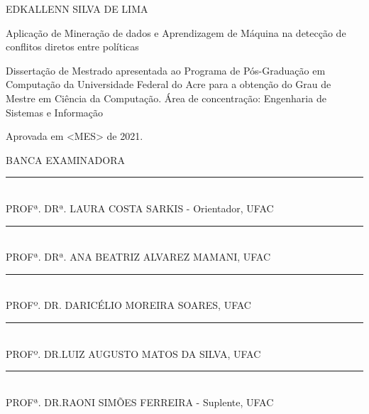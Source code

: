 \documentclass[
	12pt,				%
	openright,			%
	oneside,			%
	a4paper,			%
	english,			%
	french,				%
	spanish,			%
	brazil				%
	]{abntex2}
\begin{document}
\vspace{-60mm}

\begin{center}
	{\large EDKALLENN SILVA DE LIMA}\\
	\vspace{7mm}
	
	Aplicação de Mineração de dados e Aprendizagem de Máquina na detecção de conflitos diretos entre políticas\\
	\vspace{10mm}
\end{center}

\noindent
\begin{flushright}
	\begin{minipage}[t]{8cm}		
		Dissertação de Mestrado apresentada ao Programa de P\'{o}s-Gradua\c{c}\~{a}o em Computa\c{c}\~{a}o da Universidade Federal do Acre para a obten\c{c}\~{a}o do Grau de Mestre em Ciência da Computação. \'{A}rea de concentra\c{c}\~{a}o: Engenharia de Sistemas e Informação
		
	\end{minipage}
\end{flushright}
\vspace{1.0 cm}
\noindent
{Aprovada em <MES> de 2021.} \\
\begin{flushright}
	\parbox{11cm}
	{
		\begin{center}
			BANCA EXAMINADORA \\
			\vspace{6mm}
			\rule{11cm}{.1mm} \\
			PROFª. DRª. LAURA COSTA SARKIS - Orientador, UFAC \\
			\vspace{6mm}
			\rule{11cm}{.1mm} \\
			PROFª. DRª. ANA BEATRIZ ALVAREZ MAMANI, UFAC\\
			\vspace{6mm}
			\rule{11cm}{.1mm} \\
			PROFº. DR. DARICÉLIO MOREIRA SOARES, UFAC\\
			\vspace{4mm}
			\rule{11cm}{.1mm} \\
			PROFº. DR.LUIZ AUGUSTO MATOS DA SILVA, UFAC\\
			\vspace{6mm}
			\rule{11cm}{.1mm} \\
			PROFª. DR.RAONI SIMÕES FERREIRA - Suplente, UFAC\\
		\end{center}
	}
\end{flushright}
\end{document}
